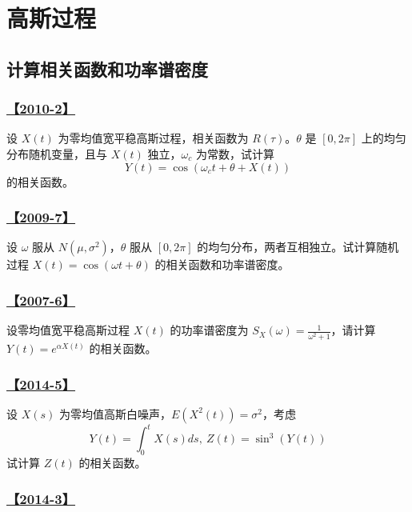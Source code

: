 \setcounter{section}{0}
\setcounter{subsection}{0}

\chapter{高斯过程}

\section{计算相关函数和功率谱密度}

\subsection{\hyperref[A2010-2]{【2010-2】}}\label{Q2010-2}

设 $X(t)$ 为零均值宽平稳高斯过程，相关函数为 $R(\tau)$。$\theta$ 是 $[0, 2\pi]$ 上的均匀分布随机变量，且与 $X(t)$ 独立，$\omega_c$ 为常数，试计算
$$
Y(t)=\cos(\omega_ct+\theta+X(t))
$$
的相关函数。

\subsection{\hyperref[A2009-7]{【2009-7】}}\label{Q2009-7}

设 $\omega$ 服从 $N(\mu, \sigma^2)$，$\theta$ 服从 $[0, 2\pi]$ 的均匀分布，两者互相独立。试计算随机过程 $X(t)=\cos(\omega t+\theta)$ 的相关函数和功率谱密度。

\subsection{\hyperref[A2007-6]{【2007-6】}}\label{Q2007-6}

设零均值宽平稳高斯过程 $X(t)$ 的功率谱密度为 $S_X(\omega)=\frac{1}{\omega^2 + 1}$，请计算 $Y(t)=e^{\alpha X(t)}$ 的相关函数。

\subsection{\hyperref[A2014-5]{【2014-5】}}\label{Q2014-5}

设 $X(s)$ 为零均值高斯白噪声，$E(X^2(t))=\sigma^2$，考虑
$$
Y(t)=\int_0^tX(s)ds, \ Z(t)=\sin^3(Y(t))
$$
试计算 $Z(t)$ 的相关函数。

\subsection{\hyperref[A2014-3]{【2014-3】}}\label{Q2014-3}

